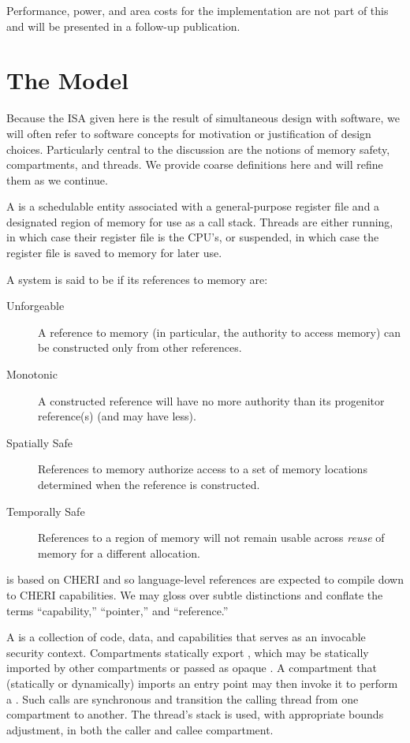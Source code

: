 Performance, power, and area costs for the implementation are not part of this and will be presented in a follow-up publication.

\section{The \cherimcuos{} Model}

Because the ISA given here is the result of simultaneous design with software, we will often refer to software concepts for motivation or justification of design choices.
Particularly central to the discussion are the notions of memory safety, compartments, and threads.
We provide coarse definitions here and will refine them as we continue.

A  is a schedulable entity associated with a general-purpose register file and a designated region of memory for use as a call stack.
Threads are either running, in which case their register file is the CPU's, or suspended, in which case the register file is saved to memory for later use.

A system is said to be  if its references to memory are:
%
\begin{description}

  \item[Unforgeable] A reference to memory (in particular, the authority to access memory) can be constructed only from other references.

  \item[Monotonic] A constructed reference will have no more authority than its progenitor reference(s) (and may have less).

  \item[Spatially Safe] References to memory authorize access to a set of memory locations determined when the reference is constructed.

  \item[Temporally Safe] References to a region of memory will not remain usable across \emph{reuse} of memory for a different allocation.

\end{description}
%
\cherimcu{} is based on CHERI and so language-level references are expected to compile down to CHERI capabilities.
We may gloss over subtle distinctions and conflate the terms ``capability,'' ``pointer,'' and ``reference.''

A  is a collection of code, data, and capabilities that serves as an invocable security context.
Compartments statically export , which may be statically imported by other compartments or passed as opaque .
A compartment that (statically or dynamically) imports an entry point may then invoke it to perform a .
Such calls are synchronous and transition the calling thread from one compartment to another.
The thread's stack is used, with appropriate bounds adjustment, in both the caller and callee compartment.

